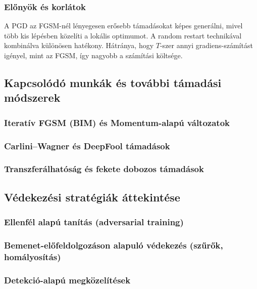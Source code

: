 \documentclass[12pt,a4paper]{article}
\begin{document}
\subsubsection{Előnyök és korlátok}

A PGD az FGSM-nél lényegesen erősebb támadásokat képes generálni, mivel több kis lépésben közelíti
a lokális optimumot. A random restart technikával kombinálva különösen hatékony. Hátránya, hogy
$T$-szer annyi gradiens-számítást igényel, mint az FGSM, így nagyobb a számítási költsége.

\subsection{Kapcsolódó munkák és további támadási módszerek}

\subsubsection{Iteratív FGSM (BIM) és Momentum-alapú változatok}

\subsubsection{Carlini--Wagner és DeepFool támadások}

\subsubsection{Transzferálhatóság és fekete dobozos támadások}

\subsection{Védekezési stratégiák áttekintése}

\subsubsection{Ellenfél alapú tanítás (adversarial training)}

\subsubsection{Bemenet-előfeldolgozáson alapuló védekezés (szűrők, homályosítás)}

\subsubsection{Detekció-alapú megközelítések}
\end{document}
